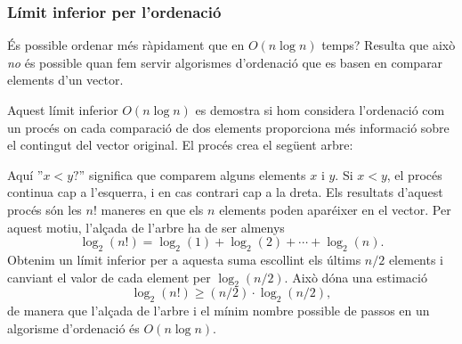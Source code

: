 \subsubsection{Límit inferior per l'ordenació}

És possible ordenar més ràpidament que en $O(n \log n)$ temps?
Resulta que això \emph{no} és possible
quan fem servir algorismes d'ordenació
que es basen en comparar elements d'un vector.

Aquest límit inferior $O(n \log n)$ es demostra si hom
considera l'ordenació com un procés on cada comparació
de dos elements proporciona més informació sobre el
contingut del vector original. El procés crea el següent arbre:

\begin{center}
\end{center}

Aquí ''$x<y?$'' significa que comparem alguns elements
$x$ i $y$. Si $x<y$, el procés continua cap a l'esquerra,
i en cas contrari cap a la dreta.
Els resultats d'aquest procés són les $n!$ maneres
en que els $n$ elements poden aparéixer en el vector.
Per aquest motiu, l'alçada de l'arbre
ha de ser almenys
\[ \log_2(n!) = \log_2(1)+\log_2(2)+\cdots+\log_2(n).\]
Obtenim un límit inferior per a aquesta suma
escollint els últims $n/2$ elements i
canviant el valor de cada element per $\log_2(n/2)$.
Això dóna una estimació
\[ \log_2(n!) \ge (n/2) \cdot \log_2(n/2),\]
de manera que l'alçada de l'arbre i el mínim
nombre possible de passos en un algorisme
d'ordenació és $O(n\log n)$.

